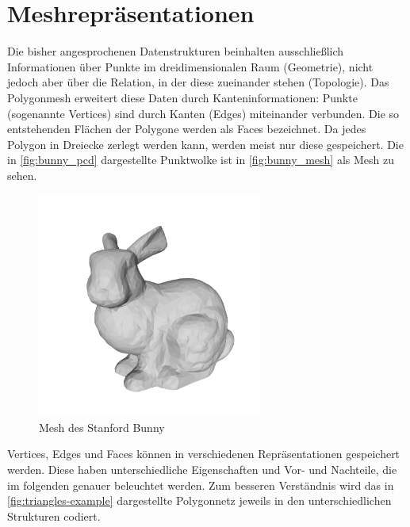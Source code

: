 \section{Meshrepräsentationen}
\label{sec:meshrepr}

Die bisher angesprochenen Datenstrukturen beinhalten ausschließlich Informationen über Punkte im dreidimensionalen Raum (Geometrie), nicht jedoch aber über die Relation, in der diese zueinander stehen (Topologie).
Das Polygonmesh erweitert diese Daten durch Kanteninformationen: Punkte (sogenannte Vertices) sind durch Kanten (Edges) miteinander verbunden.
Die so entstehenden Flächen der Polygone werden als Faces bezeichnet.
Da jedes Polygon in Dreiecke zerlegt werden kann, werden meist nur diese gespeichert.
Die in \autoref{fig:bunny_pcd} dargestellte Punktwolke ist in \autoref{fig:bunny_mesh} als Mesh zu sehen.

\begin{figure}[ht]
	\centering
	\includegraphics[width=0.66\textwidth, frame]{images/bunny_mesh.png}
	\caption{Mesh des Stanford Bunny \cite{stanfordbunny}}
	\label{fig:bunny_mesh}
\end{figure}

Vertices, Edges und Faces können in verschiedenen Repräsentationen gespeichert werden.
Diese haben unterschiedliche Eigenschaften und Vor- und Nachteile, die im folgenden genauer beleuchtet werden.
Zum besseren Verständnis wird das in \autoref{fig:triangles-example} dargestellte Polygonnetz jeweils in den unterschiedlichen Strukturen codiert.

